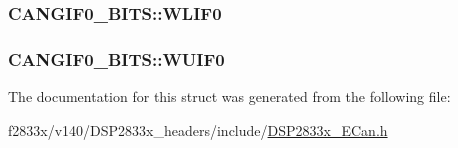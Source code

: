 \subsubsection[{W\+L\+I\+F0}]{ C\+A\+N\+G\+I\+F0\+\_\+\+B\+I\+T\+S\+::\+W\+L\+I\+F0}\label{struct_c_a_n_g_i_f0___b_i_t_s_abd439811cf6d193c0abcaef61268cd07}
\hypertarget{struct_c_a_n_g_i_f0___b_i_t_s_aca21d2308d01455cbfa4750bef7d5f72}{}
\subsubsection[{W\+U\+I\+F0}]{ C\+A\+N\+G\+I\+F0\+\_\+\+B\+I\+T\+S\+::\+W\+U\+I\+F0}\label{struct_c_a_n_g_i_f0___b_i_t_s_aca21d2308d01455cbfa4750bef7d5f72}


The documentation for this struct was generated from the following file\+:\begin{DoxyCompactItemize}
\item 
f2833x/v140/\+D\+S\+P2833x\+\_\+headers/include/\hyperlink{_d_s_p2833x___e_can_8h}{D\+S\+P2833x\+\_\+\+E\+Can.\+h}\end{DoxyCompactItemize}
